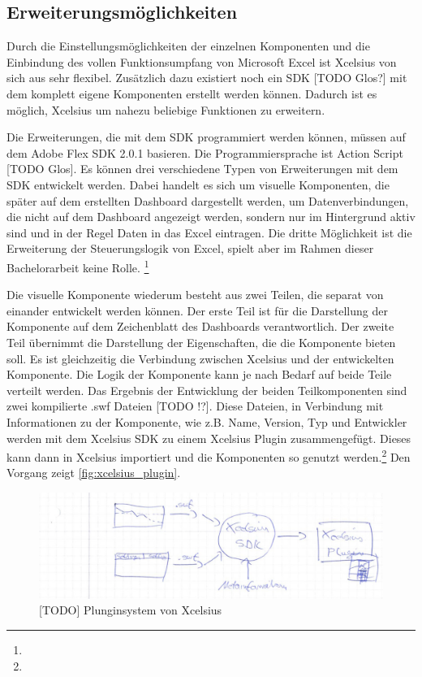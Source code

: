\subsection{Erweiterungsmöglichkeiten}

Durch die Einstellungsmöglichkeiten der einzelnen Komponenten und die Einbindung des vollen Funktionsumpfang von Microsoft Excel ist Xcelsius von sich aus sehr flexibel. Zusätzlich dazu existiert noch ein SDK [TODO Glos?] mit dem komplett eigene Komponenten erstellt werden können. Dadurch ist es möglich, Xcelsius um nahezu beliebige Funktionen zu erweitern.

Die Erweiterungen, die mit dem SDK programmiert werden können, müssen auf dem Adobe Flex SDK 2.0.1 basieren. Die Programmiersprache ist Action Script [TODO Glos]. Es können drei verschiedene Typen von Erweiterungen mit dem SDK entwickelt werden. Dabei handelt es sich um visuelle Komponenten, die später auf dem erstellten Dashboard dargestellt werden, um Datenverbindungen, die nicht auf dem Dashboard angezeigt werden, sondern nur im Hintergrund aktiv sind und in der Regel Daten in das Excel eintragen. Die dritte Möglichkeit ist die Erweiterung der Steuerungslogik von Excel, spielt aber im Rahmen dieser Bachelorarbeit keine Rolle. \footnote{ }

Die visuelle Komponente wiederum besteht aus zwei Teilen, die separat von einander entwickelt werden können. Der erste Teil ist für die Darstellung der Komponente auf dem Zeichenblatt des Dashboards verantwortlich. Der zweite Teil übernimmt die Darstellung der Eigenschaften, die die Komponente bieten soll. Es ist gleichzeitig die Verbindung zwischen Xcelsius und der entwickelten Komponente. Die Logik der Komponente kann je nach Bedarf auf beide Teile verteilt werden. Das Ergebnis der Entwicklung der beiden Teilkomponenten sind zwei kompilierte .swf Dateien [TODO !?]. Diese Dateien, in Verbindung mit Informationen zu der Komponente, wie z.B. Name, Version, Typ und Entwickler werden mit dem Xcelsius SDK zu einem Xcelsius Plugin zusammengefügt. Dieses kann dann in Xcelsius importiert und die Komponenten so genutzt werden.\footnote{ } Den Vorgang zeigt \vref{fig:xcelsius_plugin}.

\begin{figure}[h]
\centering
\setlength{\unitlength}{1mm}
\includegraphics[width=15cm]{images/Xcelsius_Plugin_Allgemein.jpg}
\caption{[TODO] Plunginsystem von Xcelsius\label{fig:xcelsius_plugin}}
\end{figure}

